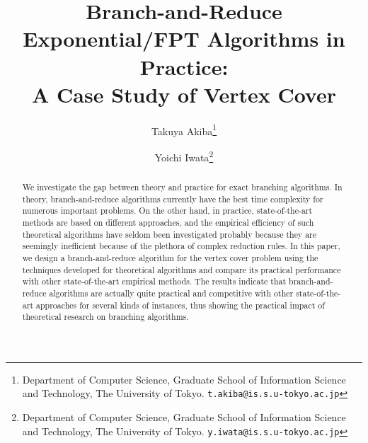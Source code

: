 \documentclass[11pt]{article}
\begin{document}
\title{\Large Branch-and-Reduce Exponential/FPT Algorithms in Practice: \\ A Case Study of Vertex Cover}
\author{
Takuya Akiba\thanks{Department of Computer Science,
    Graduate School of Information Science and Technology,
    The University of Tokyo.
    \texttt{t.akiba@is.s.u-tokyo.ac.jp}}
\and
Yoichi Iwata\thanks{Department of Computer Science,
    Graduate School of Information Science and Technology,
    The University of Tokyo.
    \texttt{y.iwata@is.s.u-tokyo.ac.jp}}
}
\date{}
\maketitle

\begin{abstract}
We investigate the gap between theory and practice for exact branching algorithms.
In theory, branch-and-reduce algorithms
currently have the best time complexity for numerous important problems.
On the other hand, in practice,
state-of-the-art methods are based on different approaches,
and the empirical efficiency of such theoretical algorithms have seldom been investigated
probably because they are seemingly inefficient because of the plethora of complex reduction rules.
In this paper,
we design a branch-and-reduce algorithm for the vertex cover problem
using the techniques developed for theoretical algorithms
and compare its practical performance with other state-of-the-art empirical methods.
The results indicate that branch-and-reduce algorithms are actually quite practical
and competitive with other state-of-the-art approaches for several kinds of instances,
thus showing the practical impact of theoretical research on branching algorithms.















 \end{abstract}
\end{document}
